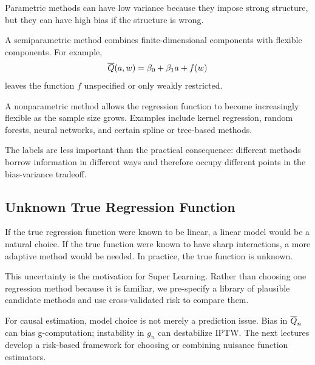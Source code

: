 Parametric methods can have low variance because they impose strong structure, but
they can have high bias if the structure is wrong.

\begin{definition}
A semiparametric method combines finite-dimensional components with flexible
components. For example,
\[
\overline{Q}(a,w)=\beta_0+\beta_1a+f(w)
\]
leaves the function $f$ unspecified or only weakly restricted.
\end{definition}

\begin{definition}
A nonparametric method allows the regression function to become increasingly
flexible as the sample size grows. Examples include kernel regression, random
forests, neural networks, and certain spline or tree-based methods.
\end{definition}

The labels are less important than the practical consequence: different methods
borrow information in different ways and therefore occupy different points in the
bias-variance tradeoff.

\subsection{Unknown True Regression Function}

If the true regression function were known to be linear, a linear model would be a
natural choice. If the true function were known to have sharp interactions, a more
adaptive method would be needed. In practice, the true function is unknown.

This uncertainty is the motivation for Super Learning. Rather than choosing one
regression method because it is familiar, we pre-specify a library of plausible
candidate methods and use cross-validated risk to compare them.

\begin{estimationbox}
For causal estimation, model choice is not merely a prediction issue. Bias in
$\overline{Q}_n$ can bias g-computation; instability in $g_n$ can destabilize IPTW. The
next lectures develop a risk-based framework for choosing or combining nuisance
function estimators.
\end{estimationbox}

